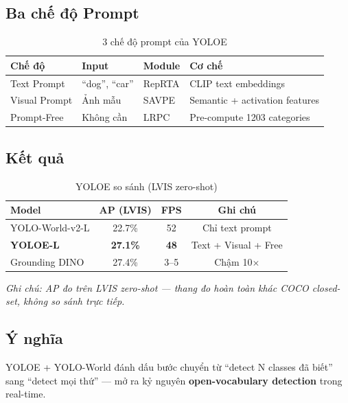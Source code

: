 \subsection{Ba chế độ Prompt}
\begin{table}[H]\centering
\caption{3 chế độ prompt của YOLOE}
\begin{tabular}{llll}\toprule
\textbf{Chế độ} & \textbf{Input} & \textbf{Module} & \textbf{Cơ chế}\\\midrule
Text Prompt & ``dog'', ``car'' & RepRTA & CLIP text embeddings \\
Visual Prompt & Ảnh mẫu & SAVPE & Semantic + activation features \\
Prompt-Free & Không cần & LRPC & Pre-compute 1203 categories \\\bottomrule
\end{tabular}
\end{table}

\subsection{Kết quả}
\begin{table}[H]\centering
\caption{YOLOE so sánh (LVIS zero-shot)}
\begin{tabular}{lccc}\toprule
\textbf{Model} & \textbf{AP (LVIS)} & \textbf{FPS} & \textbf{Ghi chú}\\\midrule
YOLO-World-v2-L \cite{yoloworld} & 22.7\% & 52 & Chỉ text prompt \\
\textbf{YOLOE-L} \cite{yoloe} & \textbf{27.1\%} & \textbf{48} & Text + Visual + Free \\
Grounding DINO & 27.4\% & 3--5 & Chậm 10$\times$ \\\bottomrule
\end{tabular}
\end{table}

\textit{Ghi chú: AP đo trên LVIS zero-shot --- thang đo hoàn toàn khác COCO closed-set, không so sánh trực tiếp.}

\subsection{Ý nghĩa}
YOLOE + YOLO-World đánh dấu bước chuyển từ ``detect N classes đã biết'' sang ``detect mọi thứ'' --- mở ra kỷ nguyên \textbf{open-vocabulary detection} trong real-time.
